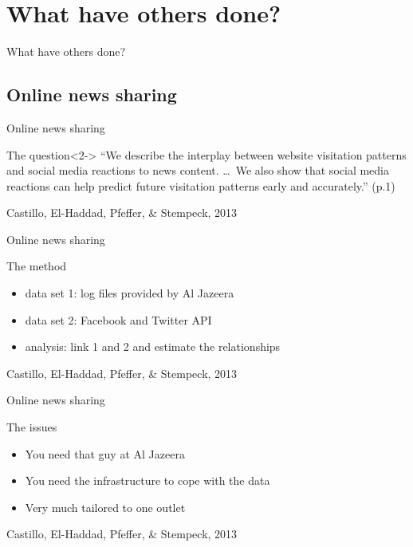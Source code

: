 \documentclass{beamer}
\begin{document}
\section{What have others done?}
\begin{frame}
What have others done?
\end{frame}

\subsection{Online news sharing}
\begin{frame}{Online news sharing}
\begin{block}{The question}<2->
``We describe the interplay between website visitation patterns and social media reactions to news content. \lbrack\ldots\rbrack ~We also show  that social media reactions can help predict future visitation patterns early and accurately.'' (p.1)
\end{block}
\footnotesize{Castillo, El-Haddad, Pfeffer, \& Stempeck, 2013}
\end{frame}

\begin{frame}{Online news sharing}
\begin{block}{The method}
\begin{itemize}
\item data set 1: log files provided by Al Jazeera
\item data set 2: Facebook and Twitter API
\item analysis: link 1 and 2 and estimate the relationships  
\end{itemize}
\end{block}
\footnotesize{Castillo, El-Haddad, Pfeffer, \& Stempeck, 2013}
\end{frame}


{
\begin{frame}[plain]
\end{frame}
}



\begin{frame}{Online news sharing}
\begin{block}{The issues}
\begin{itemize}
\item You need that guy at Al Jazeera
\item You need the infrastructure to cope with the data
\item Very much tailored to one outlet
\end{itemize}
\end{block}
\footnotesize{Castillo, El-Haddad, Pfeffer, \& Stempeck, 2013}
\end{frame}
\end{document}

